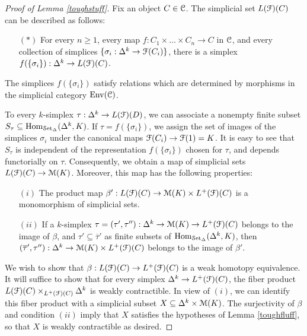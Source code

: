 \begin{proof}[Proof of Lemma \ref{toughstuff}]
Fix an object $C \in \operatorname{\mathcal{C}}$. The simplicial set $L(\operatorname{\mathcal{F}})(C)$ can be described as follows:
\begin{itemize}
\item[$(\ast)$] For every $n \geq 1$, every map $f: C_1 \times \ldots \times C_n \rightarrow C$ in $\operatorname{\mathcal{C}}$, and every collection of simplices $\{ \sigma_i: \Delta^k \rightarrow \operatorname{\mathcal{F}}(C_i) \}$, there is a simplex $f( \{ \sigma_i \}): \Delta^k \rightarrow L(\operatorname{\mathcal{F}})(C)$.
\end{itemize}
The simplices $f( \{ \sigma_i \} )$ satisfy relations which are determined by morphisms in the simplicial category $\operatorname{Env}(\operatorname{\mathcal{C}})$.

To every $k$-simplex $\tau: \Delta^k \rightarrow L(\operatorname{\mathcal{F}})(D)$, we can associate a nonempty finite subset $S_{\tau} \subseteq \operatorname{Hom}_{\operatorname{\mathcal{S}et_{\Delta}}}( \Delta^k, K)$. If $\tau = f( \{ \sigma_i \})$, we assign the set of images of the simplices $\sigma_i$ under the canonical maps $\operatorname{\mathcal{F}}(C_i) \rightarrow \operatorname{\mathcal{F}}(1) = K$. It is easy to see that $S_{\tau}$ is independent of the representation $f( \{ \sigma_i \})$ chosen for $\tau$, and depends functorially on $\tau$. Consequently, we obtain a map of simplicial sets
$L(\operatorname{\mathcal{F}})(C) \rightarrow \operatorname{{\mathcal M}}(K)$. Moreover, this map has the following properties:
\begin{itemize}
\item[$(i)$] The product map $\beta': L(\operatorname{\mathcal{F}})(C) \rightarrow \operatorname{{\mathcal M}}(K) \times L^{+}(\operatorname{\mathcal{F}})(C)$ is a monomorphism of simplicial sets. 
\item[$(ii)$] If a $k$-simplex $\tau = (\tau', \tau'') : \Delta^k \rightarrow \operatorname{{\mathcal M}}(K) \rightarrow L^{+}(\operatorname{\mathcal{F}})(C)$ belongs to the image of $\beta$, and 
$\tau' \subseteq \overline{\tau}'$ as finite subsets of $\operatorname{Hom}_{\operatorname{\mathcal{S}et_{\Delta}}}(\Delta^k, K)$, then
$(\overline{\tau}', \tau''): \Delta^k \rightarrow \operatorname{{\mathcal M}}(K) \times L^{+}(\operatorname{\mathcal{F}})(C)$ belongs to the image
of $\beta'$. 
\end{itemize}

We wish to show that $\beta: L(\operatorname{\mathcal{F}})(C) \rightarrow L^{+}(\operatorname{\mathcal{F}})(C)$ is a weak homotopy equivalence. It will suffice to show that for every simplex $\Delta^k \rightarrow L^{+}(\operatorname{\mathcal{F}})(C)$, the fiber product $L(\operatorname{\mathcal{F}})(C) \times_{ L^{+}(\operatorname{\mathcal{F}})(C) } \Delta^k$ is weakly contractible. In view of $(i)$, we can identify this fiber product with a simplicial subset $X \subseteq \Delta^k \times \operatorname{{\mathcal M}}(K)$.
The surjectivity of $\beta$ and condition $(ii)$ imply that $X$ satisfies the hypotheses of Lemma \ref{toughfluff}, so that $X$ is weakly contractible as desired.
\end{proof}

